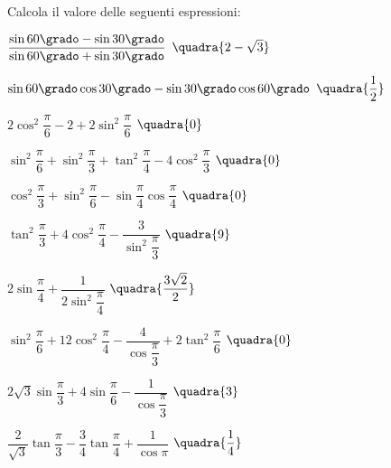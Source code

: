 \begin{esercizio}\label{ese:03.1}
Calcola il valore delle seguenti espressioni:
\begin{multicols}{2}
 \begin{enumeratea}
  \item  \(\dfrac{\sin 60 \grado -\sin 30 \grado}
                {\sin 60 \grado +\sin 30 \grado} \)
   \hfill \(\quadra{2-\sqrt{3}}\)
  \item  \(\sin 60 \grado \cos 30 \grado - \sin 30 \grado \cos 60 \grado \)
   \hfill \(\quadra{\dfrac{1}{2}}\)
  \item  \(2 \cos^2 \dfrac{\pi}{6} - 2 + 2 \sin^2 \dfrac{\pi}{6}\)
   \hfill \(\quadra{0}\)
  \item  \(\sin^2 \dfrac{\pi}{6} + \sin^2 \dfrac{\pi}{3} + 
          \tan^2 \dfrac{\pi}{4} - 4 \cos^2 \dfrac{\pi}{3}\)
   \hfill \(\quadra{0}\)
  \item  \(\cos^2 \dfrac{\pi}{3} + \sin^2 \dfrac{\pi}{6} - 
          \sin \dfrac{\pi}{4} \cos \dfrac{\pi}{4}\)
   \hfill \(\quadra{0}\)
  \item  \(\tan^2 \dfrac{\pi}{3} + 4 \cos^2 \dfrac{\pi}{4} - 
          \dfrac{3}{\sin^2 \dfrac{\pi}{3}}\)
   \hfill \(\quadra{9}\)
  \item  \(2 \sin \dfrac{\pi}{4} + \dfrac{1}{2 \sin^2 \dfrac{\pi}{4}}\)
   \hfill \(\quadra{\dfrac{3 \sqrt{2}}{2}}\)
  \item  \(\sin^2 \dfrac{\pi}{6} + 12 \cos^2 \dfrac{\pi}{4} - 
          \dfrac{4}{\cos \dfrac{\pi}{3}} + 2 \tan^2 \dfrac{\pi}{6}\)
   \hfill \(\quadra{0}\)
  \item  \(2 \sqrt{3} \sin \dfrac{\pi}{3} +4 \sin \dfrac{\pi}{6} - 
          \dfrac{1}{\cos \dfrac{\pi}{3}}\)
   \hfill \(\quadra{3}\)
  \item  \(\dfrac{2}{\sqrt{3}} \tan \dfrac{\pi}{3} -
          \dfrac{3}{4} \tan \dfrac{\pi}{4} + 
          \dfrac{1}{\cos \pi} \)
   \hfill \(\quadra{\dfrac{1}{4}}\)
 \end{enumeratea}
 \end{multicols}
\end{esercizio}

